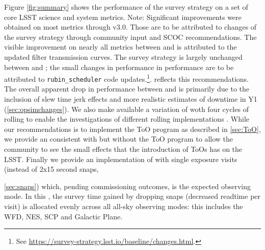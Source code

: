 Figure \autoref{fig:summary} shows the performance of the survey strategy on a set of core LSST science and system metrics. Note: Significant improvements were obtained on most metrics through v3.0. Those are to be attributed to changes of the survey strategy through community input and SCOC recommendations. The visible improvement on nearly all metrics between  and  is attributed to the updated filter transmission curves. The survey strategy is largely unchanged between  and ; the small changes in performance in performance are to be attributed to  \texttt{rubin\_scheduler} code updates.\footnote{See \url{https://survey-strategy.lsst.io/baseline/changes.html}.}.  reflects this recommendations. The overall apparent drop in performance between  and  is primarily due to the inclusion of slew time jerk effects and more realistic estimates of downtime in Y1 (\autoref{sec:opsimchanges}). We also make available a variation of  woth four cycles of rolling to enable the investigations of different rolling implementations . While our recommendations is to implement the ToO program as described in \autoref{sec:ToO}, we provide an \opsim consistent with  but without the ToO program to allow the community to see the small effects that the introduction of ToOs has on the LSST. Finally we provide an implementation of  with single exposure visits (instead of 2x15 second snaps, {\autoref{sec:snaps}) which, pending commissioning outcomes, is the expected observing mode. In this \opsim, the survey time gained by dropping snaps (decreased readtime per visit) is allocated evenly across all all-sky observing modes: this includes the WFD, NES, SCP and Galactic Plane.


}
